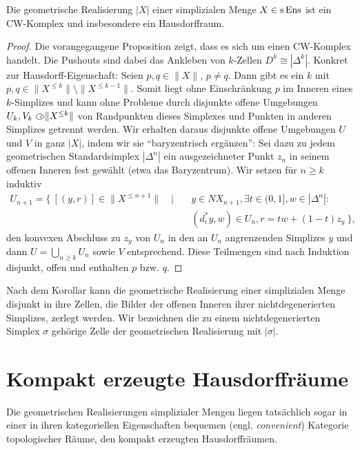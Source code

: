 \begin{kor} \label{real-hd}
  Die geometrische Realisierung $|X|$ einer simplizialen Menge $X \in
  \operatorname{s}\operatorname{Ens}$ ist ein CW-Komplex und insbesondere ein Hausdorffraum.
\end{kor}
\begin{proof}
  Die vorangegangene Proposition zeigt, dass es sich um einen
  CW-Komplex handelt. Die Pushouts sind dabei das Ankleben von
  $k$-Zellen $D^k \cong |\Delta^k|$. Konkret zur
  Hausdorff-Eigenschaft: Seien $p, q \in \|X\|$, $p \neq q$. Dann gibt
  es ein $k$ mit $p, q \in \|X^{\leq k}\| \setminus \|X^{\leq
    k-1}\|$. Somit liegt ohne Einschränkung $p$ im Inneren eines
  $k$-Simplizes und kann ohne Probleme durch disjunkte offene
  Umgebungen $U_k, V_k \subset\kern-0.58em\circ \|X^{\leq k}\|$ von Randpunkten dieses
  Simplexes und Punkten in anderen Simplizes getrennt werden. Wir
  erhalten daraus disjunkte offene Umgebungen $U$ und $V$ in ganz
  $|X|$, indem wir sie ``baryzentrisch ergänzen'': Sei dazu zu jedem
  geometrischen Standardsimplex $|\Delta^n|$ ein ausgezeichneter Punkt
  $z_n$ in seinem offenen Inneren fest gewählt (etwa das
  Baryzentrum). Wir setzen für $n \geq k$ induktiv
  \begin{align*}
    U_{n+1} = \big\{ \: [(y, r)] \in \|X^{\leq n+1}\| \quad \big| \quad
    & y \in NX_{n+1}, \exists t \in (0, 1], w \in |\Delta^n|: \\
    & (d_i^* y, w) \in U_n, r = t w + (1-t) z_y \: \big\},
  \end{align*}
  den konvexen Abschluss zu $z_y$ von $U_n$ in den an $U_n$
  angrenzenden Simplizes $y$ und dann $U = \bigcup_{n \geq k} U_n$
  sowie $V$ entsprechend. Diese Teilmengen sind nach Induktion
  disjunkt, offen und enthalten $p$ bzw. $q$.
\end{proof}
\begin{bem} \label{cw-cells}
  Nach dem Korollar kann die geometrische Realisierung einer
  simplizialen Menge disjunkt in ihre Zellen, die Bilder der offenen
  Inneren ihrer nichtdegenerierten Simplizes, zerlegt werden. Wir
  bezeichnen die zu einem nichtdegenerierten Simplex $\sigma$ gehörige
  Zelle der geometrischen Realisierung mit $|\sigma|$.
\end{bem}

\section{Kompakt erzeugte Hausdorffräume}

Die geometrischen Realisierungen simplizialer Mengen liegen
tatsächlich sogar in einer in ihren kategoriellen Eigenschaften
bequemen (engl. \emph{convenient}) Kategorie topologischer Räume, den
kompakt erzeugten Hausdorffräumen.

